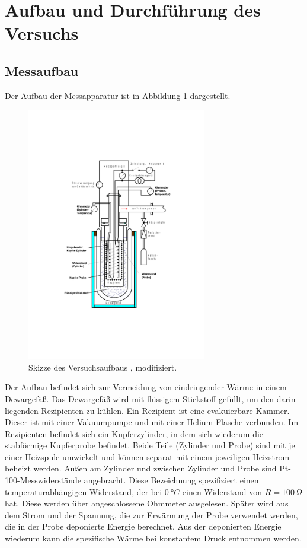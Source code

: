 \section{Aufbau und Durchführung des Versuchs}
\subsection{Messaufbau}
Der Aufbau der Messapparatur ist in Abbildung \ref{fig:aufbau} dargestellt.
\begin{figure}[!ht]
	\centering
	\includegraphics[width=0.7\textwidth]{content/images/aufbau.pdf}
    \caption{Skizze des Versuchsaufbaus \cite{anleitung}, modifiziert.}
    \label{fig:aufbau}
\end{figure}
Der Aufbau befindet sich zur Vermeidung von eindringender Wärme in einem Dewargefäß.
Das Dewargefäß wird mit flüssigem Stickstoff gefüllt, um den darin liegenden Rezipienten zu kühlen.
Ein Rezipient ist eine evakuierbare Kammer.
Dieser ist mit einer Vakuumpumpe und mit einer Helium-Flasche verbunden.
Im Rezipienten befindet sich ein Kupferzylinder, in dem sich wiederum die stabförmige Kupferprobe befindet.
Beide Teile (Zylinder und Probe) sind mit je einer Heizspule umwickelt und können separat mit einem jeweiligen Heizstrom beheizt werden.
Außen am Zylinder und zwischen Zylinder und Probe sind Pt-100-Messwiderstände angebracht.
Diese Bezeichnung spezifiziert einen temperaturabhängigen Widerstand, der bei $\SI{0}{°C}$ einen Widerstand von $R = \SI{100}{\ohm}$ hat.
Diese werden über angeschlossene Ohmmeter ausgelesen.
Später wird aus dem Strom und der Spannung, die zur Erwärmung der Probe verwendet werden, die in der Probe deponierte Energie berechnet.
Aus der deponierten Energie wiederum kann die spezifische Wärme bei konstantem Druck entnommen werden.  


